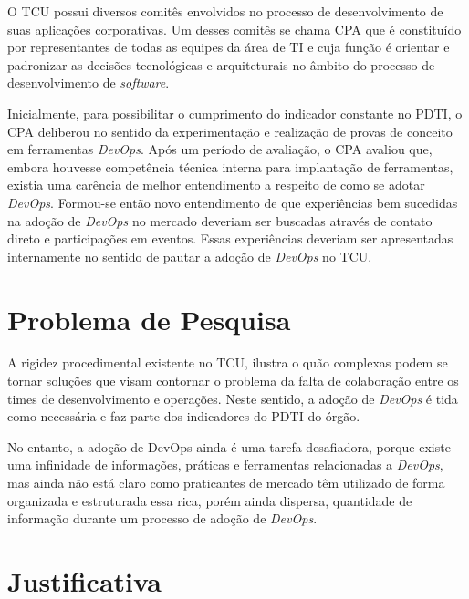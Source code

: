 O \acrshort{TCU} possui diversos comitês envolvidos no processo de desenvolvimento
de suas aplicações corporativas. Um desses comitês se chama \acrfull{CPA} que é
constituído por representantes de todas as equipes da área de \acrshort{TI} e cuja
função é orientar e padronizar as decisões tecnológicas e arquiteturais no
âmbito do processo de desenvolvimento de \textit{software}.

Inicialmente, para possibilitar o cumprimento do indicador constante no
\acrshort{PDTI}, o \acrshort{CPA} deliberou no sentido da experimentação e
realização de provas de conceito em ferramentas \textit{DevOps}. Após um
período de avaliação, o \acrshort{CPA} avaliou que, embora
houvesse competência técnica interna para implantação de ferramentas, existia
uma carência de melhor entendimento a respeito de como se adotar \textit{DevOps}.
Formou-se então novo entendimento de que experiências bem sucedidas na adoção de
\textit{DevOps} no mercado deveriam ser buscadas através de contato direto
e participações em eventos. Essas experiências deveriam ser apresentadas
internamente no sentido de pautar a adoção de \textit{DevOps} no \acrshort{TCU}.

\section{Problema de Pesquisa}%

A rigidez procedimental existente no \acrshort{TCU}, ilustra o
quão complexas podem se tornar soluções que visam contornar o problema da falta
de colaboração entre os times de desenvolvimento e operações. Neste sentido, a
adoção de {\it DevOps} é tida como necessária e faz parte dos indicadores do
\acrshort{PDTI} do órgão.

No entanto, a adoção de DevOps ainda é uma tarefa desafiadora, porque existe
uma infinidade de informações, práticas e ferramentas relacionadas a {\it DevOps},
mas ainda não está claro como praticantes de mercado têm utilizado de forma
organizada e estruturada essa rica, porém ainda dispersa, quantidade de
informação durante um processo de adoção de {\it DevOps}.

\section{Justificativa}%

